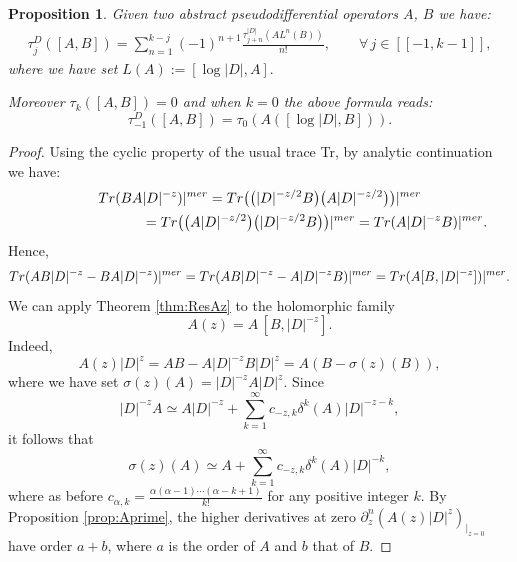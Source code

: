 \documentclass[11pt]{article}
\newtheorem{proposition}{Proposition}
\numberwithin{equation}{section}
\begin{document}
\begin{proposition} Given two abstract pseudodifferential operators $A$, $B$ we have:
\begin{gather}\label{eq:taujDbracket}\tau_j^{D}([A,B])=\sum_{n= 1}^{k-j}
 (-1)^{n+1}\frac{\tau_{j+n}^{\vert D\vert} \left(
    A L^n(B)\right)}{n!},\qquad \forall\,
  j\in[[-1,k-1]],  \end{gather}
where we have set  $L(A):=  [\log \vert D\vert, A].$

Moreover $\tau_k([A,B])=0$ and when $k=0$ the above formula reads:
\[
\tau_{-1}^{D}([A,B ])=\tau_{0}\left( A \left([ \log
    \vert D\vert ,B] \right)\right).
    \]
\end{proposition}

\begin{proof}  Using the cyclic property of the
usual trace Tr, by analytic continuation we have:
\begin{gather*}
{\rm Tr} (B  A
  \vert D\vert^{-z} )\vert^{\rm mer} = {\rm Tr}\big(\big(\vert D\vert^{-z/2}B\big)  \big(A
  \vert D\vert^{-z/2}\big)\big)\vert^{\rm mer}\\
  \phantom{{\rm Tr} (B  A   \vert D\vert^{-z} )\vert^{\rm mer} }{}
 = {\rm Tr}\big( \big(A
  \vert D\vert^{-z/2}\big) \big( \vert D\vert^{-z/2}B\big)\big)\vert^{\rm mer}
 = {\rm Tr} ( A  \vert D\vert^{-z} B )\vert^{\rm mer}.
\end{gather*} Hence,
\begin{gather*}
{\rm Tr} ( A  B\vert D\vert^{-z}-B  A
  \vert D\vert^{-z} )\vert^{\rm mer} =  {\rm Tr} ( A  B \vert
  D\vert^{-z}-A \vert D\vert^{-z}B )\vert^{\rm mer}
 =  {\rm Tr} ( A [B ,\vert
  D\vert^{-z} ] )\vert^{\rm mer} .
\end{gather*}
We can apply Theorem \ref{thm:ResAz} to the holomorphic family
\[
A(z)= A\, [B, \vert
  D\vert^{-z}].
  \] Indeed,
\[
A(z) \vert
    D\vert^z= A  B -A \vert D\vert^{-z}B \vert
    D\vert^z= A   (B- \sigma(z)(B)),
    \]
where we have set $\sigma(z)(A)= \vert D\vert^{-z}  A \vert
    D\vert^z$. Since
    \[
    \vert D\vert^{-z} A\simeq  A  \vert D\vert^{-z}+
     \sum_{k=1}^\infty c_{-z,k}
\delta^k(A)   \vert D\vert^{-z-k},
\] it follows that
\[
\sigma(z)(A)\simeq A+ \sum_{k=1}^\infty c_{-z,k}
\delta^k(A)   \vert D\vert^{ -k},
\] where as before
 $c_{ \alpha, k}= \frac{\alpha(\alpha-1)\cdots (\alpha-k+1)}{k!}$ for any positive
 integer $k$. By
 Proposition \ref{prop:Aprime}, the  higher derivatives at zero $\partial_z^n (A(z) \vert
    D\vert^z)_{\vert_{z=0}}$  have order $a+b$, where $a$ is the order of $A$
    and $b$ that of $B$.


\end{proof}
\end{document}
